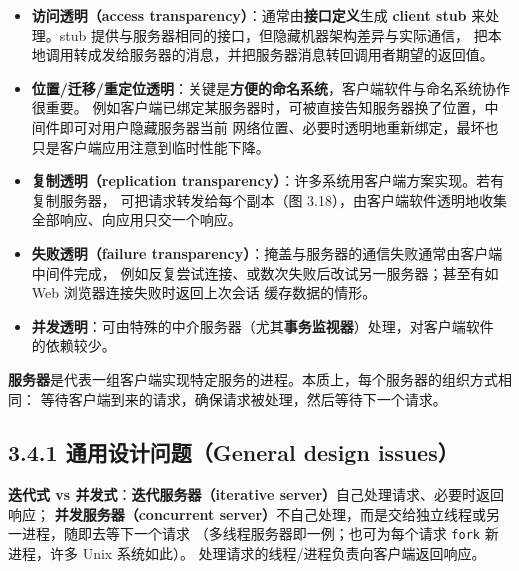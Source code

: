 \begin{itemize}
  \item \textbf{访问透明（access transparency）}：通常由\textbf{接口定义}生成
        \textbf{client stub} 来处理。stub 提供与服务器相同的接口，但隐藏机器架构差异与实际通信，
        把本地调用转成发给服务器的消息，并把服务器消息转回调用者期望的返回值。
  \item \textbf{位置/迁移/重定位透明}：关键是\textbf{方便的命名系统}，客户端软件与命名系统协作很重要。
        例如客户端已绑定某服务器时，可被直接告知服务器换了位置，中间件即可对用户隐藏服务器当前
        网络位置、必要时透明地重新绑定，最坏也只是客户端应用注意到临时性能下降。
  \item \textbf{复制透明（replication transparency）}：许多系统用客户端方案实现。若有复制服务器，
        可把请求转发给每个副本（图 3.18），由客户端软件透明地收集全部响应、向应用只交一个响应。
  \item \textbf{失败透明（failure transparency）}：掩盖与服务器的通信失败通常由客户端中间件完成，
        例如反复尝试连接、或数次失败后改试另一服务器；甚至有如 Web 浏览器连接失败时返回上次会话
        缓存数据的情形。
  \item \textbf{并发透明}：可由特殊的中介服务器（尤其\textbf{事务监视器}）处理，对客户端软件
        的依赖较少。
\end{itemize}

\begin{closeread}
\end{closeread}



\textbf{服务器}是代表一组客户端实现特定服务的进程。本质上，每个服务器的组织方式相同：
等待客户端到来的请求，确保请求被处理，然后等待下一个请求。

\subsection*{3.4.1 通用设计问题（General design issues）}
\textbf{迭代式 vs 并发式}：\textbf{迭代服务器（iterative server）}自己处理请求、必要时返回响应；
\textbf{并发服务器（concurrent server）}不自己处理，而是交给独立线程或另一进程，随即去等下一个请求
（多线程服务器即一例；也可为每个请求 \texttt{fork} 新进程，许多 Unix 系统如此）。
处理请求的线程/进程负责向客户端返回响应。

